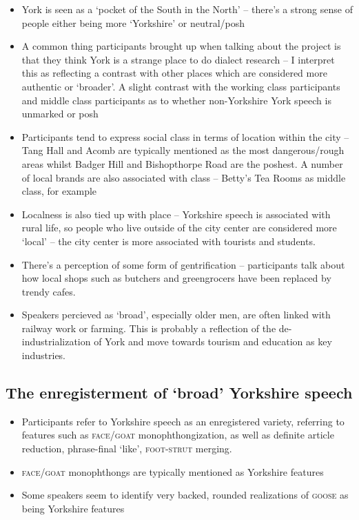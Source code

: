 \documentclass{article}
\begin{document}
\begin{itemize}
\item{York is seen as a `pocket of the South in the North' -- there's a strong sense of people either being more `Yorkshire' or neutral/posh}
\item{A common thing participants brought up when talking about the project is that they think York is a strange place to do dialect research -- I interpret this as reflecting a contrast with other places which are considered more authentic or `broader'. A slight contrast with the working class participants and middle class participants as to whether non-Yorkshire York speech is unmarked or posh}
\item{Participants tend to express social class in terms of location within the city -- Tang Hall and Acomb are typically mentioned as the most dangerous/rough areas whilst Badger Hill and Bishopthorpe Road are the poshest. A number of local brands are also associated with class -- Betty's Tea Rooms as middle class, for example}
\item{Localness is also tied up with place -- Yorkshire speech is associated with rural life, so people who live outside of the city center are considered more `local' -- the city center is more associated with tourists and students.}
\item{There's a perception of some form of gentrification -- participants talk about how local shops such as butchers and greengrocers have been replaced by trendy cafes.}
\item{Speakers percieved as `broad', especially older men, are often linked with railway work or farming. This is probably a reflection of the de-industrialization of York and move towards tourism and education as key industries.}

\end{itemize}
\subsection*{The enregisterment of `broad' Yorkshire speech}
\begin{itemize}
\item{Participants refer to Yorkshire speech as an enregistered variety, referring to features such as \textsc{face}/\textsc{goat} monophthongization, as well as definite article reduction, phrase-final `like', \textsc{foot-strut} merging.}
\item{\textsc{face}/\textsc{goat} monophthongs are typically mentioned as Yorkshire features}
\item{Some speakers seem to identify very backed, rounded realizations of \textsc{goose} as being Yorkshire features}
\end{itemize}
\end{document}
